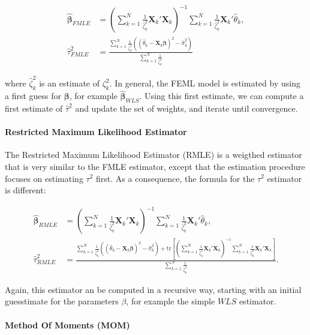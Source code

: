 \documentclass[]{book}
\let\oldparagraph\paragraph
\renewcommand{\paragraph}[1]{\oldparagraph{#1}\mbox{}}
\theoremstyle{definition}
\theoremstyle{definition}
\theoremstyle{definition}
\theoremstyle{remark}
\begin{document}
\begin{align*}
  \mathbf{\hat{\beta}}_{FMLE} & = \left(\sum_{k=1}^N\frac{1}{\hat{\zeta}^2_k}\mathbf{X}_k'\mathbf{X}_k\right)^{-1}\sum_{k=1}^N\frac{1}{\hat{\zeta}^2_k}\mathbf{X}_k'\hat{\theta}_k,\\
 \hat{\tau}^2_{FMLE} & = \frac{\sum_{k=1}^N\frac{1}{\hat{\zeta}^4_k}\left((\hat{\theta}_k -\mathbf{X}_k\mathbf{\beta})^2-\hat{\sigma}^2_k\right)}{\sum_{k=1}^N\frac{1}{\hat{\zeta}^4_k}}
\end{align*}

where \(\hat{\zeta}^2_k\) is an estimate of \(\zeta^2_{k}\). In general,
the FEML model is estimated by using a first guess for
\(\mathbf{\beta}\), for example \(\mathbf{\hat{\beta}}_{WLS}\). Using
this first estimate, we can compute a first estimate of \(\hat{\tau}^2\)
and update the set of weights, and iterate until convergence.

\paragraph{Restricted Maximum Likelihood
Estimator}\label{restricted-maximum-likelihood-estimator}

The Restricted Maximum Likelihood Estimator (RMLE) is a weigthed
estimator that is very similar to the FMLE estimator, except that the
estimation procedure focuses on estimating \(\tau^2\) first. As a
consequence, the formula for the \(\tau^2\) estimator is different:

\begin{align*}
  \mathbf{\hat{\beta}}_{RMLE} & = \left(\sum_{k=1}^N\frac{1}{\hat{\zeta}^2_k}\mathbf{X}_k'\mathbf{X}_k\right)^{-1}\sum_{k=1}^N\frac{1}{\hat{\zeta}^2_k}\mathbf{X}_k'\hat{\theta}_k,\\
 \hat{\tau}^2_{RMLE} & = \frac{\sum_{k=1}^N\frac{1}{\hat{\zeta}^4_k}\left((\hat{\theta}_k -\mathbf{X}_k\mathbf{\beta})^2-\hat{\sigma}^2_k\right)
                          +\text{tr}\left[\left(\sum_{k=1}^N\frac{1}{\hat{\zeta}^2_k}\mathbf{X}_k'\mathbf{X}_k\right)^{-1}\sum_{k=1}^N\frac{1}{\hat{\zeta}^2_k}\mathbf{X}_k'\mathbf{X}_k\right]}
                          {\sum_{k=1}^N\frac{1}{\hat{\zeta}^4_k}}.
\end{align*}

Again, this estimator an be computed in a recursive way, starting with
an initial guesstimate for the parameters \(\beta\), for example the
simple \(WLS\) estimator.

\paragraph{Method Of Moments (MOM)}\label{method-of-moments-mom}
\end{document}
